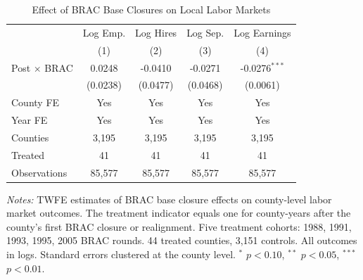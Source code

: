 \begin{table}[!t]
\centering
\caption{Effect of BRAC Base Closures on Local Labor Markets}
\label{tab:main}
\begin{tabular}{lcccc}
\hline\hline
 & Log Emp. & Log Hires & Log Sep. & Log Earnings \\
 & (1) & (2) & (3) & (4) \\
\hline
Post $\times$ BRAC & 0.0248 & -0.0410 & -0.0271 & -0.0276$^{***}$ \\
 & (0.0238) & (0.0477) & (0.0468) & (0.0061) \\
[6pt]
County FE & Yes & Yes & Yes & Yes \\
Year FE & Yes & Yes & Yes & Yes \\
Counties & 3,195 & 3,195 & 3,195 & 3,195 \\
Treated & 41 & 41 & 41 & 41 \\
Observations & 85,577 & 85,577 & 85,577 & 85,577 \\
\hline\hline
\end{tabular}
\begin{tablenotes}[flushleft]\small
\item \textit{Notes:} TWFE estimates of BRAC base closure effects on county-level labor market outcomes. The treatment indicator equals one for county-years after the county's first BRAC closure or realignment. Five treatment cohorts: 1988, 1991, 1993, 1995, 2005 BRAC rounds. 44 treated counties, 3,151 controls. All outcomes in logs. Standard errors clustered at the county level. $^{*}$ $p<0.10$, $^{**}$ $p<0.05$, $^{***}$ $p<0.01$.
\end{tablenotes}
\end{table}

